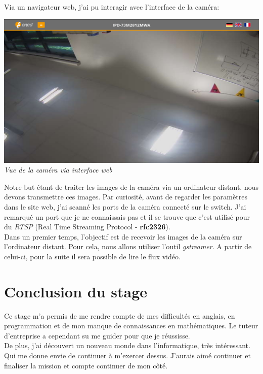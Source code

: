 \documentclass[12pt, french]{report}
\begin{document}
Via un navigateur web, j'ai pu interagir avec l'interface de la caméra:
\begin{center}
\includegraphics[width=\textwidth]{Cameras/WebSiteView.png}\\
\textit{Vue de la caméra via interface web}\\
\end{center}

Notre but étant de traiter les images de la caméra via un ordinateur distant, nous devons transmettre ces images. Par curiosité, avant de regarder les paramètres dans le site web, j'ai scanné les ports de la caméra connecté sur le switch. J'ai remarqué un port que je ne connaissais pas et il se trouve que c'est utilisé pour du \textit{RTSP} (Real Time Streaming Protocol - \textbf{rfc2326}). \\

Dans un premier temps, l'objectif est de recevoir les images de la caméra sur l'ordinateur distant. Pour cela, nous allons utiliser l'outil \textit{gstreamer}. A partir de celui-ci, pour la suite il sera possible de lire le flux vidéo.

\newpage
\section{Conclusion du stage}

Ce stage m'a permis de me rendre compte de mes difficultés en anglais, en programmation et de mon manque de connaissances en mathématiques. Le tuteur d'entreprise a cependant su me guider pour que je réussisse.\\

De plus, j'ai découvert un nouveau monde dans l'informatique, très intéressant. Qui me donne envie de continuer à m'exercer dessus. J'aurais aimé continuer et finaliser la mission et compte continuer de mon côté.\\
\end{document}
